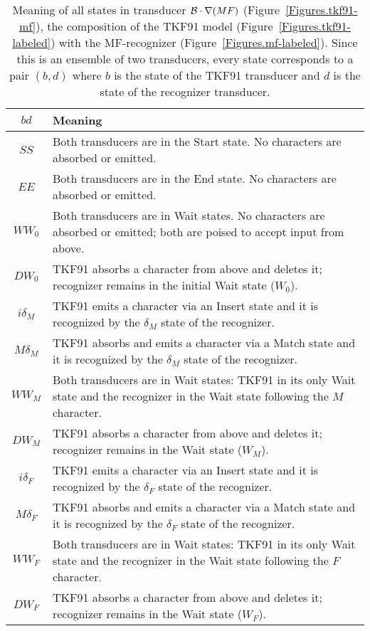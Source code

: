 \documentclass{article}
\newcommand{\tablabel}[1]{\label{tab.#1}}
\newcommand{\figref}[1]{Figure~\ref{Figures.#1}}
\newcommand\tkf{{\cal B}}
\newcommand\recognize{\nabla}
\begin{document}
\begin{table}
\begin{tabular}{c|p{}}
$b d$ & Meaning \\
\hline
$SS$ & Both transducers are in the Start state.  No characters are  absorbed or emitted. \\
$EE$ & Both transducers are in the End state.  No characters are  absorbed or emitted. \\
$WW_0$ & Both transducers are in Wait states.  No characters are absorbed or emitted; both are poised to accept input from above.  \\
$DW_0$ & TKF91 absorbs a character from above and deletes it; recognizer remains in the initial Wait state ($W_0$).   \\
$i\delta_M$ & TKF91 emits a character via an Insert state and it is recognized by the $\delta_M$ state of the recognizer.   \\
$M\delta_M$ & TKF91 absorbs and emits a character via a Match state and it is recognized by the $\delta_M$ state of the recognizer.   \\
$WW_M$ & Both transducers are in Wait states: TKF91 in its only Wait state and the recognizer in the Wait state following the $M$ character.  \\
$DW_M$ & TKF91 absorbs a character from above and deletes it; recognizer remains in the Wait state ($W_M$).   \\
$i\delta_F$ & TKF91 emits a character via an Insert state and it is recognized by the $\delta_F$ state of the recognizer.   \\
$M\delta_F$ & TKF91 absorbs and emits a character via a Match state and it is recognized by the $\delta_F$ state of the recognizer.   \\
$WW_F$ & Both transducers are in Wait states: TKF91 in its only Wait state and the recognizer in the Wait state following the $F$ character.  \\
$DW_F$ & TKF91 absorbs a character from above and deletes it; recognizer remains in the Wait state ($W_F$).   \\
\end{tabular}
\caption{ \tablabel{tkf91-mf} Meaning of all states in
transducer $\tkf \cdot \recognize(MF)$ (\figref{tkf91-mf}),
the composition of the TKF91 model (\figref{tkf91-labeled}) with the MF-recognizer (\figref{mf-labeled}).
Since this is an ensemble of two transducers, every state corresponds to a pair $(b,d)$
where
$b$ is the state of the TKF91 transducer and
$d$ is the state of the recognizer transducer.
 }
\end{table}
\end{document}
